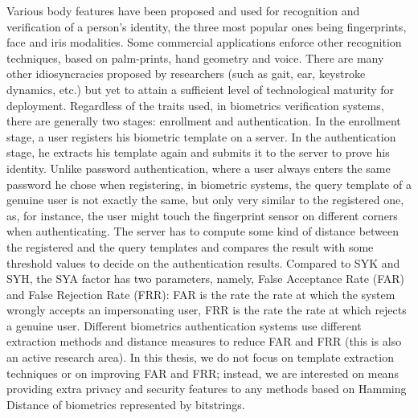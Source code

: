 Various body features have been proposed and used for recognition and
verification of a person's identity, the three most popular ones being fingerprints, face and
iris modalities. Some commercial applications enforce other recognition techniques, based on palm-prints, hand geometry and voice. There are many other idiosyncracies proposed by
researchers (such as gait, ear, keystroke dynamics, etc.) but yet to attain a
sufficient level of technological maturity for deployment. Regardless of the
traits used, in biometrics verification systems, there are generally two stages:
enrollment and authentication. In the enrollment stage, a user registers his
biometric template on a server. In the authentication stage, he extracts
his template again and submits it to the server to prove his identity. Unlike password
authentication, where a user always enters the same password he chose when
registering, in biometric systems, the query template of a genuine user is not exactly the same, but only very similar to the registered one, as, for instance, the user
might touch the fingerprint sensor on different corners when
authenticating. The server has to compute some kind of distance between the
registered and the query templates and compares the result with some threshold
values to decide on the authentication results. Compared to SYK and SYH, the SYA
factor has two parameters, namely, False Acceptance Rate (FAR) and False
Rejection Rate (FRR): FAR is the rate the rate at which the system wrongly accepts an
impersonating user, FRR is the rate the rate at which rejects a genuine
user. Different biometrics authentication systems use different extraction
methods and distance measures to reduce FAR and FRR (this is also an active
research area). In this thesis, we do not focus on template extraction techniques
or on improving FAR and FRR; instead, we are interested on means providing extra
privacy and security features to any methods based on Hamming Distance
of biometrics represented by bitstrings.


